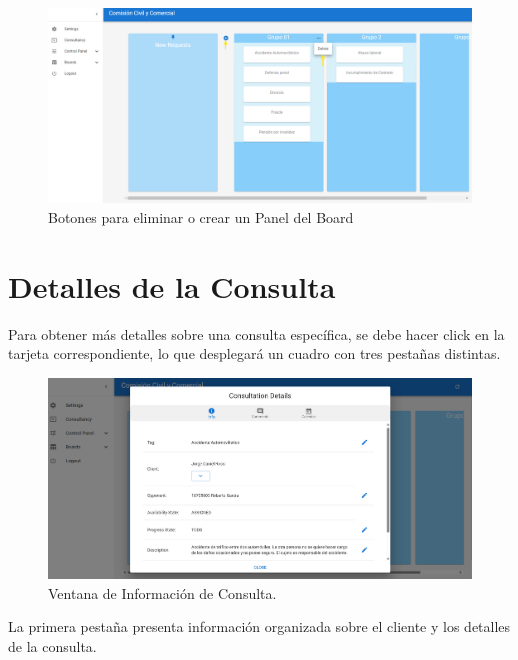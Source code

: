 \begin{figure}[H]
    \centering
    \includegraphics[width=1\linewidth]{fig/delete-panel.png}
    \caption{Botones para eliminar o crear un Panel del Board}
    \label{fig:delete-panel}
\end{figure}





\section{Detalles de la Consulta}\label{sec:info-consulta}

Para obtener más detalles sobre una consulta específica, se debe hacer click en la tarjeta correspondiente, lo que desplegará un cuadro con tres pestañas distintas.

\begin{figure}[H]
    \centering
    \includegraphics[width=1\linewidth]{fig/info-consulta.png}
    \caption{Ventana de Información de Consulta.}
    \label{fig:consulta-info}
\end{figure}

La primera pestaña presenta información organizada sobre el cliente y los detalles de la consulta.

